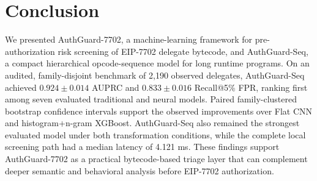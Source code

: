 \documentclass[conference]{IEEEtran}
\begin{document}
\section{Conclusion}
\label{sec:conclusion}

We presented AuthGuard-7702, a machine-learning framework for pre-authorization risk screening of EIP-7702 delegate bytecode, and AuthGuard-Seq, a compact hierarchical opcode-sequence model for long runtime programs. On an audited, family-disjoint benchmark of 2,190 observed delegates, AuthGuard-Seq achieved $0.924\pm0.014$ AUPRC and $0.833\pm0.016$ Recall@5\% FPR, ranking first among seven evaluated traditional and neural models. Paired family-clustered bootstrap confidence intervals support the observed improvements over Flat CNN and histogram+n-gram XGBoost. AuthGuard-Seq also remained the strongest evaluated model under both transformation conditions, while the complete local screening path had a median latency of 4.121 ms. These findings support AuthGuard-7702 as a practical bytecode-based triage layer that can complement deeper semantic and behavioral analysis before EIP-7702 authorization.
\end{document}
